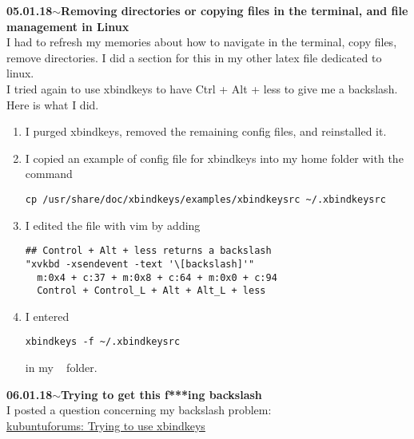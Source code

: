 \documentclass[11pt,a4paper]{article}
\newenvironment{loggentry}[2]%
{\noindent\textbf{#1}\hspace{1cm}$\mathbf{\sim}$\text{ }\textbf{#2}\\}{\vspace{0.5cm}}
\begin{document}
\begin{loggentry}{05.01.18}{Removing directories or copying files in the terminal, and file management in Linux}
I had to refresh my memories about how to navigate in the terminal, copy files, remove directories. I did a section for this in my other latex file dedicated to linux.\\

I tried again to use xbindkeys to have Ctrl + Alt + less to give me a backslash. Here is what I did.
\begin{enumerate}
\item I purged xbindkeys, removed the remaining config files, and reinstalled it.
\item I copied an example of config file for xbindkeys into my home folder with the command
\begin{verbatim}
cp /usr/share/doc/xbindkeys/examples/xbindkeysrc ~/.xbindkeysrc
\end{verbatim}
\item I edited the file with vim by adding
\begin{verbatim}
## Control + Alt + less returns a backslash
"xvkbd -xsendevent -text '\[backslash]'"
  m:0x4 + c:37 + m:0x8 + c:64 + m:0x0 + c:94
  Control + Control_L + Alt + Alt_L + less
\end{verbatim}
\item I entered
\begin{verbatim}
xbindkeys -f ~/.xbindkeysrc
\end{verbatim}
in my ~ folder.
\end{enumerate}
\end{loggentry}

\begin{loggentry}{06.01.18}{Trying to get this f***ing backslash}
I posted a question concerning my backslash problem:\\
\href{https://www.kubuntuforums.net/showthread.php/72847-Trying-to-use-xbindkeys?p=408761#post408761}{kubuntuforums: Trying to use xbindkeys}
\end{loggentry}
\end{document}
